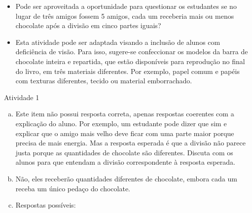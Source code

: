 \begin{multicols}{2}
\begin{itemize}
      \item Pode ser aproveitada a oportunidade para questionar os estudantes se no lugar de três amigos fossem 5 amigos, cada um receberia mais ou menos chocolate após a divisão em cinco partes iguais? 
\end{itemize} %


\begin{itemize} %
    \item Esta atividade pode ser adaptada visando a inclusão de alunos com deficiência de visão. Para isso, sugere-se confeccionar os modelos da barra de chocolate  inteira e repartida, que estão disponíveis para reprodução no final do livro, em três materiais diferentes. Por exemplo, papel comum e papéis com texturas diferentes, tecido ou material emborrachado.
\end{itemize} %


\begin{resposta*}{Atividade 1}
  \begin{enumerate}[a),wide,labelindent=0pt] %
    \item       Este item não possui resposta correta, apenas respostas coerentes com a explicação do aluno. Por exemplo, um estudante pode dizer que sim e explicar que o amigo mais velho deve ficar com uma parte maior porque precisa de mais energia. Mas a resposta esperada é que a divisão não parece justa porque as quantidades de chocolate são diferentes. Discuta com os alunos para que entendam a divisão correspondente à resposta esperada.
    \item Não, eles receberão quantidades diferentes de chocolate, embora cada um receba um único pedaço do chocolate.
    \item Respostas possíveis:



\end{enumerate}
\end{resposta*}
\end{multicols}
